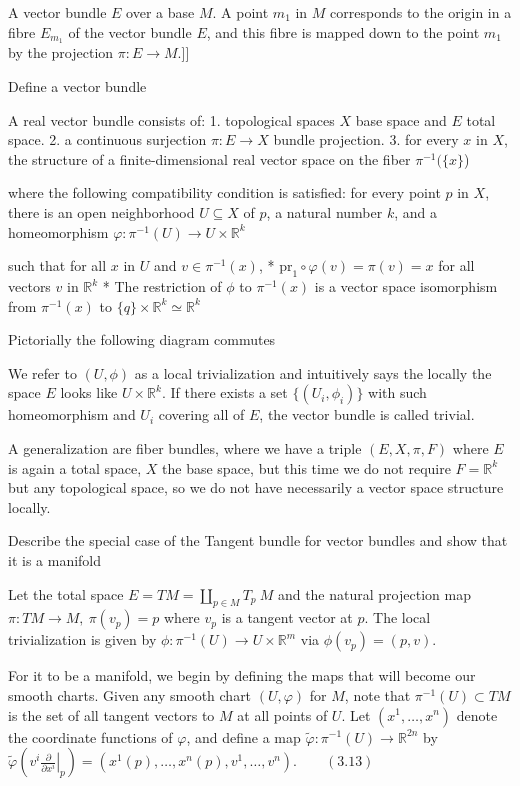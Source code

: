 A vector bundle \(E\) over a base \(M\). 
A point \(m_1\) in \(M\) corresponds to the origin in a fibre \(E_{m_1}\) of the vector bundle \(E\), and this fibre is mapped down to the point \(m_1\) by the 
projection \(\pi: E \to M\).]]

Define a vector bundle

A real vector bundle consists of:
1. topological spaces \(X\) base space and \(E\) total space.
2. a continuous surjection \(\pi:E \to X\) bundle projection.
3. for every \(x\) in \(X\), the structure of a finite-dimensional real vector space on the fiber \(\pi^{-1}(\{x\}\))

where the following compatibility condition is satisfied: 
for every point \(p\) in \(X\), there is an open neighborhood \(U\subseteq X\) of \(p\), a natural number \(k\), and a homeomorphism
\(\varphi\colon \pi^{-1}(U) \to U \times \mathbb{R}^k\) 


such that for all \(x\) in \(U\) and \( v \in \pi^{-1}(x) \),
* \( \text{pr}_1 \circ \varphi(v) = \pi(v) = x \) for all vectors \(v\) in \(\mathbb{R}^k\)
* The restriction of \( \phi \) to \( \pi^{-1}(x) \) is a vector space isomorphism from \( \pi^{-1}(x) \) to \( \{q\}\times \mathbb{R}^k \simeq \mathbb{R}^k \)

Pictorially the following diagram commutes

We refer to \( (U, \phi) \) as  a local trivialization and intuitively says the locally the space \( E \) looks like \(U\times \mathbb{R}^k\).
If there exists a set \( \{(U_i, \phi_i)\} \) with such homeomorphism and \( U_i \) covering all of \( E \), the vector bundle is called trivial.

A generalization are fiber bundles, where we have a triple \( (E, X, \pi, F) \) where \( E \) is again a total space,
\( X \) the base space, but this time we do not require \( F = \mathbb{R}^k \) but any topological space, 
so we do not have necessarily a vector space structure locally.


Describe the special case of the Tangent bundle for vector bundles
and show that it is a manifold

Let the total space \( E = TM = \amalg_{p \in M} T_p\ M \) and the natural projection map \( \pi : TM \to M,\ \pi(v_p) = p \)
where \( v_p \) is a tangent vector at \( p \). The local trivialization is given by \( \phi : \pi^{-1}(U) \to U \times \mathbb{R}^m \)
via \( \phi(v_p) = (p, v) \).

For it to be a manifold, we begin by defining the maps that will become our smooth charts. 
Given any smooth chart \((U, \varphi)\) for \(M\), note that \(\pi^{-1}(U) \subset TM\) 
is the set of all tangent vectors to \(M\) at all points of \(U\). 
Let \((x^1, \dots, x^n)\) denote the coordinate functions of \(\varphi\), 
and define a map \(\tilde{\varphi} : \pi^{-1}(U) \to \mathbb{R}^{2n}\) by 
\(\tilde{\varphi} \left( \left. v^i \frac{\partial}{\partial x^i} \right|_p \right) = (x^1(p), \dots, x^n(p), v^1, \dots, v^n). \qquad (3.13)\)

